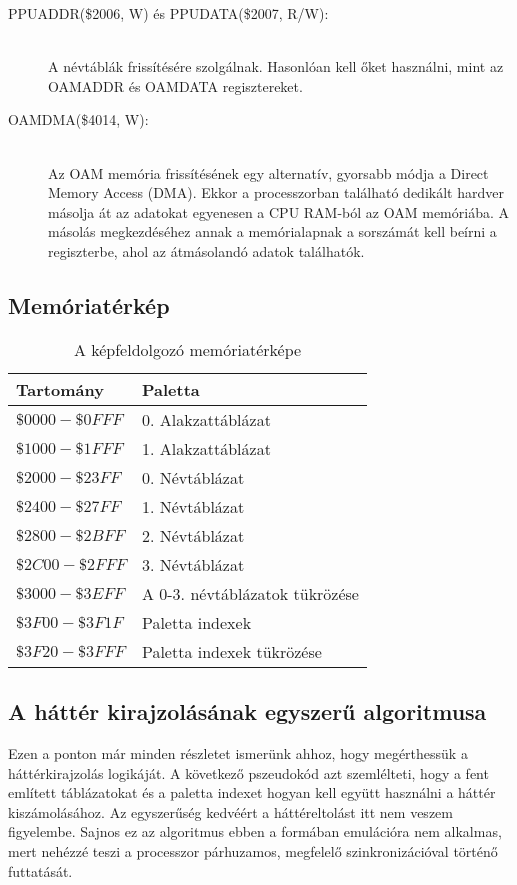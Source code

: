 \begin{description}
	\item[PPUADDR(\$2006, W) és PPUDATA(\$2007, R/W):] \hfill \\
	A névtáblák frissítésére szolgálnak. Hasonlóan kell őket használni, mint az OAMADDR és OAMDATA regisztereket.
	\item[OAMDMA(\$4014, W):] \hfill \\
	Az OAM memória frissítésének egy alternatív, gyorsabb módja a Direct Memory Access (DMA). Ekkor a processzorban található dedikált hardver másolja át az adatokat egyenesen a CPU RAM-ból az OAM memóriába. A másolás megkezdéséhez annak a memórialapnak a sorszámát kell beírni a regiszterbe, ahol az átmásolandó adatok találhatók.
\end{description}

\subsection{Memóriatérkép}

\begin{table}[H]
	\centering
	\begin{tabular}{ | l | l | }
		\hline
		Tartomány & Paletta \\
		\hline			
		$ \$0000 - \$0FFF $ & 0. Alakzattáblázat \\
		$ \$1000 - \$1FFF $ & 1. Alakzattáblázat \\
		$ \$2000 - \$23FF $ & 0. Névtáblázat \\
		$ \$2400 - \$27FF $ & 1. Névtáblázat \\
		$ \$2800 - \$2BFF $ & 2. Névtáblázat \\
		$ \$2C00 - \$2FFF $ & 3. Névtáblázat \\
		$ \$3000 - \$3EFF $ & A 0-3. névtáblázatok tükrözése \\
		$ \$3F00 - \$3F1F $ & Paletta indexek \\
		$ \$3F20 - \$3FFF $ & Paletta indexek tükrözése \\
		\hline
	\end{tabular}
	\caption{A képfeldolgozó memóriatérképe}
	\label{fig:ppumemmap}
\end{table}

\subsection{A háttér kirajzolásának egyszerű algoritmusa}

Ezen a ponton már minden részletet ismerünk ahhoz, hogy megérthessük a háttérkirajzolás logikáját. A következő pszeudokód azt szemlélteti, hogy a fent említett táblázatokat és a paletta indexet hogyan kell együtt használni a háttér kiszámolásához. Az egyszerűség kedvéért a háttéreltolást itt nem veszem figyelembe. Sajnos ez az algoritmus ebben a formában emulációra nem alkalmas, mert nehézzé teszi a processzor párhuzamos, megfelelő szinkronizációval történő futtatását.
\vspace{0.3cm}

